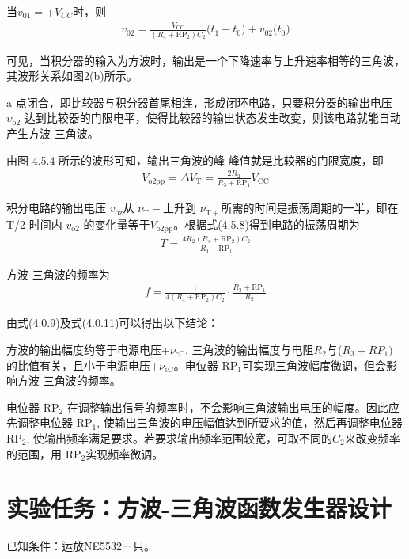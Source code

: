 \documentclass[a4paper,11pt,UTF8]{article}
\numberwithin{equation}{subsection}
\begin{document}
当$v_{01}=+V_{CC}$时，则
\begin{align}
	v_{02}=\frac{V_{\mathrm{CC}}}{(R_{4}+\mathrm{RP}_{2})C_{2}}\big(t_{1}-t_{0}\big)+v_{02}\big(t_{0}\big)
\end{align}

可见，当积分器的输入为方波时，输出是一个下降速率与上升速率相等的三角波，其波形关系如图2(b)所示。

a 点闭合，即比较器与积分器首尾相连，形成闭环电路，只要积分器的输出电压 $\upsilon_\mathrm{o2}$ 达到比较器的门限电平，使得比较器的输出状态发生改变，则该电路就能自动产生方波-三角波。

由图 4.5.4 所示的波形可知，输出三角波的峰-峰值就是比较器的门限宽度，即
\begin{align}
	V_{\mathrm{o2pp}}=\Delta V_{\mathrm{T}}=\frac{2R_{2}}{R_{3}+\mathrm{RP}_{1}}V_{\mathrm{CC}}
\end{align}

积分电路的输出电压 $v_\mathrm{oz}$从 $\nu_\mathrm{T}-$上升到 $\nu_\mathrm{T+}$所需的时间是振荡周期的一半，即在 T/2 时间内 $v_\mathrm{o2}$ 的变化量等于$V_\mathrm{o2pp}$。根据式(4.5.8)得到电路的振荡周期为
\begin{align}
	T=\frac{4R_2(R_4+\mathrm{RP}_2)C_2}{R_3+\mathrm{RP}_1}
\end{align}

方波-三角波的频率为
\begin{align}
	f=\frac{1}{4(R_4+\mathrm{RP}_2)C_2}\cdot\frac{R_3+\mathrm{RP}_1}{R_2}
\end{align}

由式(4.0.9)及式(4.0.11)可以得出以下结论： 

 方波的输出幅度约等于电源电压+$\nu_\mathrm{cC}$, 三角波的输出幅度与电阻$R_2$与($R_3+{RP}_1)$ 的比值有关，且小于电源电压+$\nu_\mathrm{\epsilon C}$。电位器 RP$_{1}$可实现三角波幅度微调，但会影响方波-三角波的频率。

 电位器 RP$_{2}$ 在调整输出信号的频率时，不会影响三角波输出电压的幅度。因此应先调整电位器 RP$_1$, 使输出三角波的电压幅值达到所要求的值，然后再调整电位器 RP$_2$, 使输出频率满足要求。若要求输出频率范围较宽，可取不同的$C_{2}$来改变频率的范围，用 RP$_{2}$实现频率微调。


\section{实验任务：方波-三角波函数发生器设计}
\noindent 已知条件：运放NE5532一只。
\end{document}
